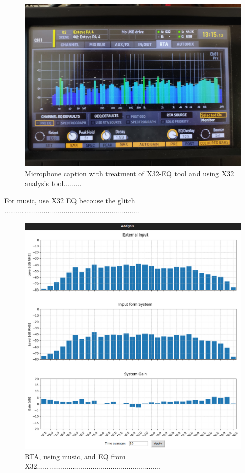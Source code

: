 \begin{figure}[H]
	\centering
	\includegraphics[width=0.6
	\linewidth]{Figures/Coro_X32_treatedX32.jpeg}
	\caption{Microphone caption with treatment of X32-EQ tool and using X32 analysis tool.........}
	\label{fig:Coro_X32_treatedX32}
\end{figure}

For music, use X32 EQ becouse the glitch ....................................................................

\begin{figure}[H]
	\centering
	\includegraphics[width=0.6
	\linewidth]{Figures/Coro_Music_EQ_X32.png}
	\caption{RTA, using music, and EQ from X32..............................................................}
	\label{fig:Coro_RTA_music}
\end{figure}

